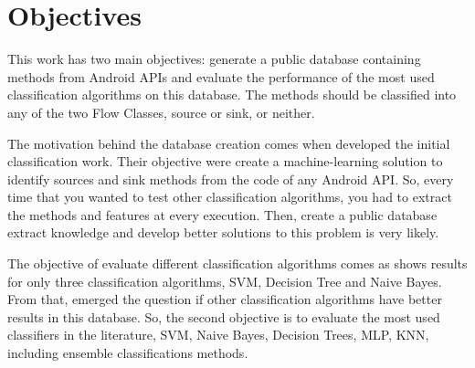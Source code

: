 \chapter{Objectives}
This work has two main objectives: generate a public database containing methods from Android APIs and evaluate the 
performance of the most used classification algorithms on this database. The methods should be classified into any 
of the two Flow Classes, source or sink, or neither.

The motivation behind the database creation comes when \cite{rasthofer2014machine} developed the initial 
classification work. Their objective were create a machine-learning solution to identify sources and sink methods 
from the code of any Android API. So, every time that you wanted to test other classification algorithms, you had 
to extract the methods and features at every execution. Then, create a public database extract knowledge and 
develop better solutions to this problem is very likely.

The objective of evaluate different classification algorithms comes as \cite{rasthofer2014machine} shows results 
for only three classification algorithms, SVM, Decision Tree and Naive Bayes. From that, emerged the question if 
other classification algorithms have better results in this database. So, the second objective is to evaluate the 
most used classifiers in the literature, SVM, Naive Bayes, Decision Trees, MLP, KNN, including ensemble 
classifications methods.
